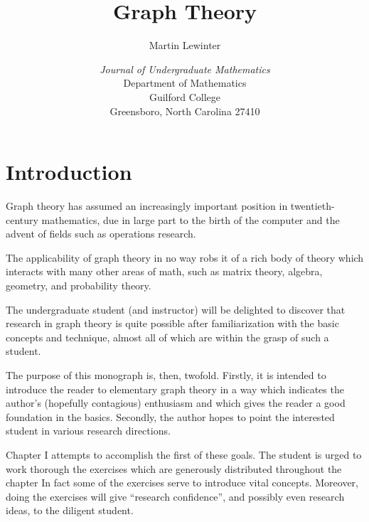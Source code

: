 \documentclass{article}
\let\titlepageAuthor\author
\renewcommand{\author}[1]{\newcommand{\headerAuthor}{#1}\titlepageAuthor{#1}}
\let\titlepageTitle\title
\renewcommand{\title}[1]{\newcommand{\headerTitle}{#1}\titlepageTitle{#1}}
\begin{document}
\title{Graph Theory}
\author{Martin Lewinter}
\date{\vspace{3cm}
\emph{Journal of Undergraduate Mathematics}
  \\ Department of Mathematics
  \\ Guilford College
  \\ Greensboro, North Carolina 27410 
  }
\maketitle
\thispagestyle{empty}



\newpage

\setcounter{tocdepth}{3} 
\tableofcontents
\thispagestyle{empty}


\newpage


\section*{Introduction}


Graph theory has assumed an increasingly important position in twentieth-century mathematics, due in large part to the birth of the computer and the advent of fields such as operations research.

The applicability of graph theory in no way robs it of a rich body of theory which interacts with many other areas of math, such as matrix theory, algebra, geometry, and probability theory.

The undergraduate student (and instructor) will be delighted to discover that research in graph theory is quite possible after familiarization with the basic concepts and technique, almost all of which are within the grasp of such a student. 

The purpose of this monograph is, then, twofold. Firstly, it is intended to introduce the reader to elementary graph theory in a way which indicates the author's (hopefully contagious) enthusiasm and which gives the reader a good foundation in the basics. Secondly, the author hopes to point the interested student in various research directions. 

Chapter I attempts to accomplish the first of these goals. The student is urged to work thorough the exercises which are generously distributed throughout the chapter In fact some of the exercises serve to introduce vital concepts. Moreover, doing the exercises will give ``research confidence'', and possibly even research ideas, to the diligent student. 
\end{document}
